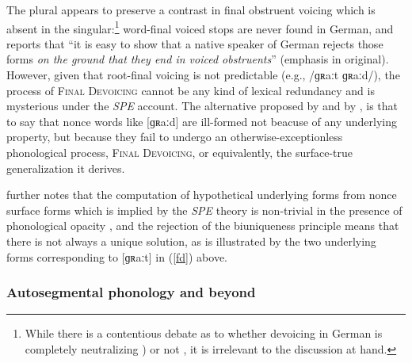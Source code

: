 \noindent The plural appears to preserve a contrast in final obstruent voicing which is absent in the singular:\footnote{While there is a contentious debate as to whether devoicing in German is completely neutralizing \citep[e.g.,][]{Fourakis1984}) or not \citep[e.g.,][]{Port1985}, it is irrelevant to the discussion at hand.} word-final voiced stops are never found in German, and \citet[95]{Shibatani1973} reports that ``it is easy to show that a native speaker of German rejects those forms \emph{on the ground that they end in voiced obstruents}'' (emphasis in original). However, given that root-final voicing is not predictable (e.g., /ɡʀaːt \alt{} ɡʀaːd/), the process of \textsc{Final Devoicing} cannot be any kind of lexical redundancy and is mysterious under the \emph{SPE} account. The alternative proposed by \citeauthor{Shibatani1973} and by \citet{Clayton1976}, is that to say that nonce words like [ɡʀaːd] are ill-formed not beacuse of any underlying property, but because they fail to undergo an otherwise-exceptionless phonological process, \textsc{Final Devoicing}, or equivalently, the surface-true generalization it derives.

\citet{Sommerstein1974} further notes that the computation of hypothetical underlying forms from nonce surface forms which is implied by the \emph{SPE} theory is non-trivial in the presence of phonological opacity \citep[see][528f.]{Anderson1988a}, and the rejection of the biuniqueness principle means that there is not always a unique solution, as is illustrated by the two underlying forms corresponding to [ɡʀaːt] in (\ref{fd}) above.

\subsubsection{Autosegmental phonology and beyond}

